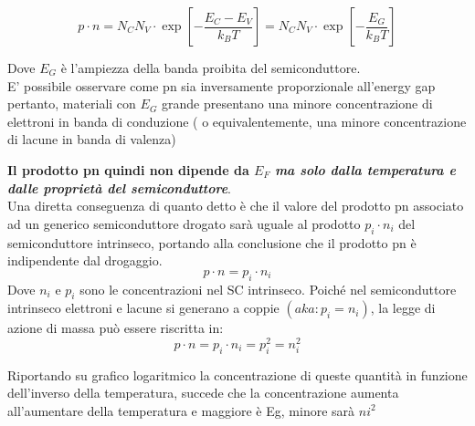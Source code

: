 \begin{equation}
	p \cdot n=N_C N_V \cdot \exp \left[-\dfrac{E_C-E_V}{k_B T}\right]=
        N_C N_V \cdot \exp \left[-\dfrac{E_G}{k_B T}\right]
\end{equation}

Dove $E_G$ è l'ampiezza della banda proibita del semiconduttore. \\
E' possibile osservare come pn sia inversamente proporzionale all'energy gap pertanto, materiali con $E_G$ grande presentano una minore concentrazione di elettroni in banda di conduzione ( o equivalentemente, una minore concentrazione di lacune in banda di valenza)

\textbf{Il prodotto pn quindi non dipende da $E_F$ \emph{ma solo dalla temperatura e dalle proprietà del semiconduttore}}.\\
Una diretta conseguenza di quanto detto è che il valore del prodotto pn associato ad un generico semiconduttore drogato sarà uguale al prodotto $p_i \cdot n_i$ del semiconduttore intrinseco, portando alla conclusione che il prodotto pn è indipendente dal drogaggio.
\begin{equation}
	p \cdot n=p_i \cdot n_i
\end{equation}
Dove $n_i$ e $p_i$ sono le concentrazioni nel SC intrinseco.
Poiché nel semiconduttore intrinseco elettroni e lacune si generano a coppie $(aka: p_i=n_i)$, la legge di azione di massa può essere riscritta in:
\begin{equation}
	p \cdot n=p_i \cdot n_i=p_i^2=n_i^2
\end{equation}

\begin{center}
\end{center}
Riportando su grafico logaritmico la concentrazione di queste quantità in funzione dell'inverso della temperatura, succede che la concentrazione aumenta all'aumentare della temperatura e maggiore è Eg, minore sarà $ni^2$

